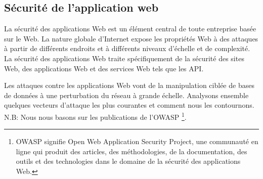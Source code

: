 \subsection{Sécurité de l'application web}
    La sécurité des applications Web est un élément central de 
    toute entreprise basée sur le Web. La nature globale d'Internet 
    expose les propriétés Web à des attaques à partir de différents 
    endroits et à différents niveaux d'échelle et de complexité. 
    La sécurité des applications Web traite spécifiquement de la 
    sécurité des sites Web, des applications Web et des services 
    Web tels que les API.
    \par 
    Les attaques contre les applications Web vont de la manipulation 
    ciblée de bases de données à une perturbation du réseau à grande 
    échelle. Analysons ensemble quelques vecteurs d’attaque les plus courantes
    et comment nous les contournons. N.B: Nous nous basons sur les publications
    de l'OWASP \footnote{
    OWASP signifie Open Web Application Security Project, une communauté 
    en ligne qui produit des articles, des méthodologies, de la documentation, 
    des outils et des technologies dans le domaine de la sécurité des applications 
    Web.}.
    
    
